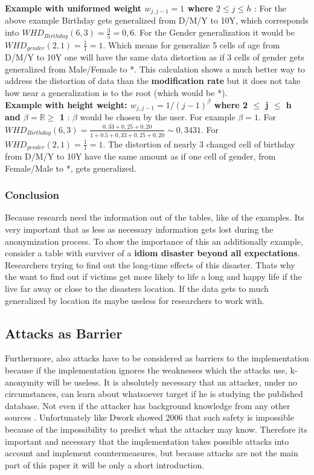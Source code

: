 \documentclass{llncs}
\newcommand{\R}{\mathbb{R}}
\begin{document}
\textbf{Example with uniformed weight $w_{j,j-1} = 1$ where $2\leq j \leq h$} \cite{li2006achieving}: For the above example Birthday gets generalized from D/M/Y to 10Y, which corresponds into $WHD_{Birthday}(6,3) = \frac{3}{5} = 0,6$. For the Gender generalization it would be $WHD_{gender}(2,1) = \frac{1}{1} = 1$. Which means for generalize 5 cells of age from D/M/Y to 10Y one will have the same data distortion as if 3 cells of gender gets generalized from Male/Female to *. This calculation shows a much better way to address the distortion of data than the \textbf{modification rate} but it does not take how near a generalization is to the root (which would be *).\\

\textbf{Example with height weight: $w_{j,j-1} = 1 / (j-1)^{\beta}$ where 2 $\leq$ j $\leq$ h and $\beta = \R \geq$ 1} \cite{li2006achieving}:
$\beta$ would be chosen by the user. For example $\beta = 1$. For $WHD_{Birthday}(6,3) = \frac{0,\overline{33}+0,25+0,20}{1+0.5+0,\overline{33}+0,25+0,20} \sim 0,3431$. For $WHD_{gender}(2,1) = \frac{1}{1} = 1$. The distortion of nearly 3 changed cell of birthday from D/M/Y to  10Y have the same amount as if one cell of gender, from Female/Male to *, gets generalized. 

\subsubsection{Conclusion}

Because research need the information out of the tables, like of the examples. Its very important that as less as necessary information gets lost during the anonymization process. To show the importance  of this an additionally example, consider a table with surviver of a \textbf{idiom disaster beyond all expectations}. Researchers trying to find out the long-time effects of this disaster. Thats why the want to find out if victims get more likely to life a long and happy life if the live far away or close to the disasters location. If the data gets to much generalized by location its maybe useless for researchers to work with.

\subsection{Attacks as Barrier}

Furthermore, also attacks have to be considered as barriers to the implementation because if the implementation ignores the weaknesses which the attacks
use, k-anonymity will be useless. It is absolutely necessary that an attacker, under no circumstances, can learn about whatsoever target if he is studying the
published database. Not even if the attacker has background knowledge from
any other sources \cite{Dalenius1977}. Unfortunately like Dwork showed 2006 that such safety is impossible because of the impossibility to predict what the attacker may know. Therefore its important and necessary that the implementation takes possible attacks into account and implement countermeasures, but because attacks are not the main part of this paper it will be only a short introduction. 
\end{document}

